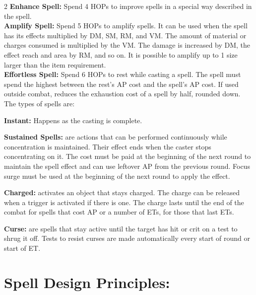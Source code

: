 \begin{multicols}{2}
\textbf{Enhance Spell:} Spend 4 HOPs to improve spells in a special way described in the spell.  \\

\textbf{Amplify Spell:} Spend 5 HOPs to amplify spells. It can be used when the spell has its effects multiplied by DM, SM, RM, and VM. The amount of material or charges consumed is multiplied by the VM. The damage is increased by DM, the effect reach and area by RM, and so on. It is possible to amplify up to 1 size larger than the item requirement.\\

\textbf{Effortless Spell:} Spend 6 HOPs to rest while casting a spell. The spell must spend the highest between the rest's AP cost and the spell's AP cost. If used outside combat, reduces the exhaustion cost of a spell by half, rounded down.  \\

The types of spells are:

\begin{proplist}
    \item \textbf{Instant:} Happens as the casting is complete.
    \item \textbf{Sustained Spells:} are actions that can be performed continuously while concentration is maintained. Their effect ends when the caster stops concentrating on it. The cost must be paid at the beginning of the next round to maintain the spell effect and can use leftover AP from the previous round. Focus surge must be used at the beginning of the next round to apply the effect.
    \item \textbf{Charged:} activates an object that stays charged. The charge can be released when a trigger is activated if there is one. The charge lasts until the end of the combat for spells that cost AP or a number of ETs, for those that last ETs.
    \item \textbf{Curse:} are spells that stay active until the target has hit or crit on a test to shrug it off. Tests to resist curses are made automatically every start of round or start of ET.
\end{proplist}

\section{Spell Design Principles:}


\end{multicols}

